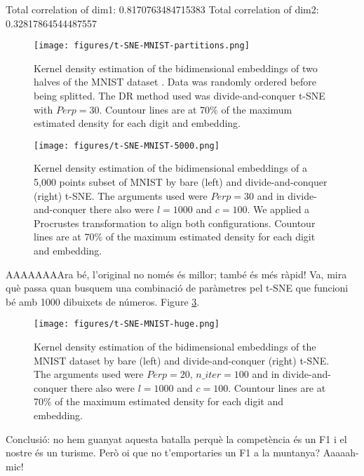 Total correlation of dim1: 0.8170763484715383
Total correlation of dim2: 0.32817864544487557

\begin{figure}[ht]
    \centering
    \texttt{[image: figures/t-SNE-MNIST-partitions.png]}
    \caption{Kernel density estimation of the bidimensional embeddings of two halves of the MNIST dataset \citep{Cohen2017}. Data was randomly ordered before being splitted. The DR method used was divide-and-conquer t-SNE with $Perp=30$. Countour lines are at 70\% of the maximum estimated density for each digit and embedding.}
    \label{fig:t-SNE-MNIST-partitions}
\end{figure}

\begin{figure}[ht]
    \centering
    \texttt{[image: figures/t-SNE-MNIST-5000.png]}
    \caption{Kernel density estimation of the bidimensional embeddings of a 5,000 points subset of MNIST \citep{Cohen2017} by bare (left) and divide-and-conquer (right) t-SNE. The arguments used were $Perp=30$ and in divide-and-conquer there also were $l=1000$ and $c=100$. We applied a Procrustes transformation to align both configurations. Countour lines are at 70\% of the maximum estimated density for each digit and embedding.}
    \label{fig:t-SNE-MNIST}
\end{figure}

AAAAAAAAra bé, l'original no només és millor; també és més ràpid! Va, mira què passa quan busquem una combinació de paràmetres pel t-SNE que funcioni bé amb 1000 dibuixets de números. Figure \ref{fig:t-SNE-MNIST-huge}.

\begin{figure}[ht]
    \centering
    \texttt{[image: figures/t-SNE-MNIST-huge.png]}
    \caption{Kernel density estimation of the bidimensional embeddings of the MNIST dataset \citep{Cohen2017} by bare (left) and divide-and-conquer (right) t-SNE. The arguments used were $Perp=20, \, n\_iter=100$ and in divide-and-conquer there also were $l=1000$ and $c=100$. Countour lines are at 70\% of the maximum estimated density for each digit and embedding.}
    \label{fig:t-SNE-MNIST-huge}
\end{figure}


Conclusió: no hem guanyat aquesta batalla perquè la competència és un F1 i el nostre és un turisme. Però oi que no t'emportaries un F1 a la muntanya? Aaaaah-mic!
